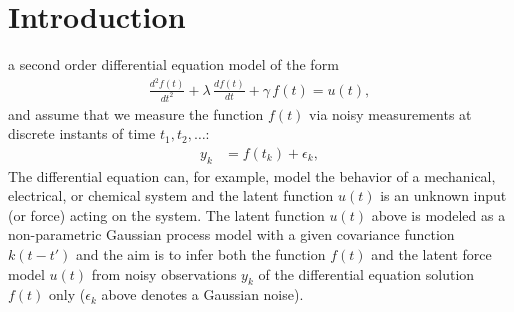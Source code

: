 \documentclass[journal]{IEEEtran}
\newcommand{\simo}[1]{{\color{red}#1}}
\begin{document}
\section{Introduction}


 a second order differential equation model of the form
%
\begin{equation}
\begin{split}
  \frac{d^{2}f(t)}{dt^{2}} + \lambda \, \frac{df(t)}{dt} + \gamma \, f(t) = u(t),
\end{split}
\end{equation}
%
and assume that we measure the function $f(t)$ via noisy measurements at discrete instants of time $t_1,t_2,\ldots$:
%
\begin{equation}
\begin{split}
  y_k &= f(t_k) + \epsilon_k,
\end{split}
\end{equation}
%
The differential equation can, for example, model the behavior of a mechanical, electrical, or chemical system and the latent function $u(t)$ is an unknown input (or force) acting on the system. The latent function $u(t)$ above is modeled as a non-parametric Gaussian process model \cite{Rasmussen+Williams:2006} with a given covariance function $k(t - t')$ and the aim is to infer both the function $f(t)$ and the latent force model $u(t)$ from noisy observations $y_k$ of the differential equation solution $f(t)$ only ($\epsilon_k$ above denotes a Gaussian noise).
\end{document}
